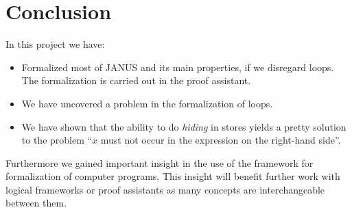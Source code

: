 \chapter{Conclusion}

In this project we have:
\begin{itemize}
\item Formalized most of JANUS and its main properties, if we
  disregard loops. The formalization is carried out in the \coq{}
  proof assistant.
\item We have uncovered a problem in the formalization of loops.
\item We have shown that the ability to do \emph{hiding} in stores
  yields a pretty solution to the problem ``$x$ must not occur in the
  expression on the right-hand side''.
\end{itemize}

Furthermore we gained important insight in the use of the \coq{}
framework for formalization of computer programs. This insight will
benefit further work with logical frameworks or proof assistants as
many concepts are interchangeable between them.


